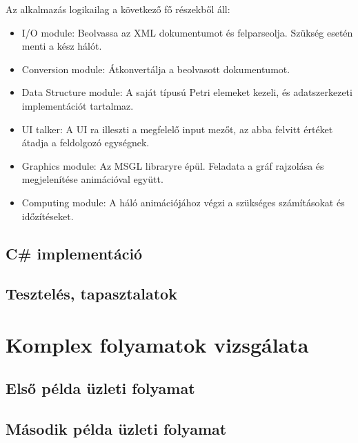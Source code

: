 \documentclass[12pt,a4paper]{book}
\begin{document}
Az alkalmazás logikailag a következő fő részekből áll:
\begin{itemize}
\item I/O module: Beolvassa az XML dokumentumot és felparseolja. Szükség esetén menti a kész hálót.
\item Conversion module: Átkonvertálja  a beolvasott dokumentumot.
\item Data Structure module: A saját típusú Petri elemeket kezeli, és adatszerkezeti implementációt tartalmaz. 
\item UI talker: A UI ra illeszti a megfelelő input mezőt, az abba felvitt értéket átadja a feldolgozó egységnek.
\item Graphics module: Az MSGL libraryre épül. Feladata a gráf rajzolása és megjelenítése animációval együtt. 
\item Computing module: A háló animációjához végzi a szükséges számításokat és időzítéseket. 
\end{itemize}

\section{C\# implementáció}


\section{Tesztelés, tapasztalatok}


\chapter{Komplex folyamatok vizsgálata}

\section{Első példa üzleti folyamat}


\section{Második példa üzleti folyamat}
\end{document}
